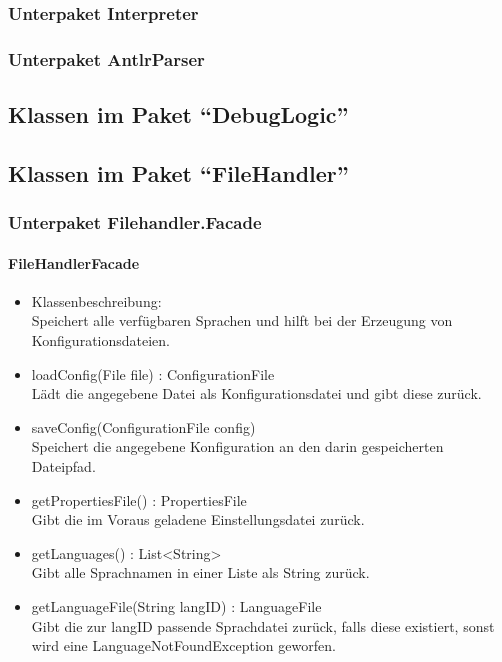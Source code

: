 ﻿\documentclass[parskip=full]{scrartcl}
\begin{document}
\subsubsection{Unterpaket Interpreter}

\subsubsection{Unterpaket AntlrParser}

\subsection{Klassen im Paket \enquote{DebugLogic}}

\subsection{Klassen im Paket \enquote{FileHandler}}

\subsubsection{Unterpaket Filehandler.Facade}
\paragraph{FileHandlerFacade}
\begin{itemize}
\item Klassenbeschreibung: \\
Speichert alle verfügbaren Sprachen und hilft bei der Erzeugung von Konfigurationsdateien.
\item loadConfig(File file) : ConfigurationFile \\
Lädt die angegebene Datei als Konfigurationsdatei und gibt diese zurück.
\item saveConfig(ConfigurationFile config) \\
Speichert die angegebene Konfiguration an den darin gespeicherten Dateipfad.
\item getPropertiesFile() : PropertiesFile \\
Gibt die im Voraus geladene Einstellungsdatei zurück.
\item getLanguages() : List<String> \\
Gibt alle Sprachnamen in einer Liste als String zurück.
\item getLanguageFile(String langID) : LanguageFile \\
Gibt die zur langID passende Sprachdatei zurück, falls diese existiert,
sonst wird eine LanguageNotFoundException geworfen.
\end{itemize}
\end{document}
